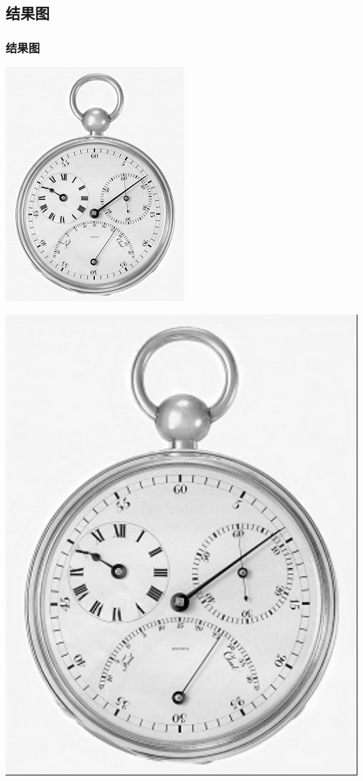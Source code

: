 \documentclass[notheorems,serif,table,compress]{beamer}  %
\begin{document}
\subsection{结果图}
\begin{frame}
\frametitle{结果图}
	\begin{minipage}[t]{0.4\linewidth}
        \centering
        \includegraphics[width=0.5\linewidth]{1.jpg} 
        \end{minipage}
	\begin{minipage}[t]{0.4\linewidth}
        \centering
        \includegraphics[width=1\linewidth]{Bilinear-pots.jpg} 
        \end{minipage}

\end{frame}
\end{document}

